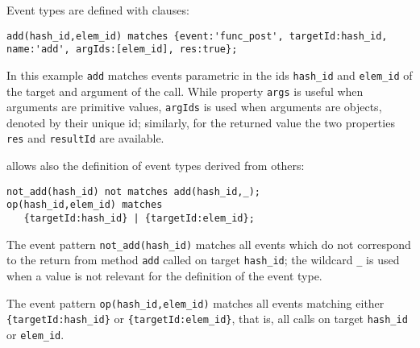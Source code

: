 Event types are defined with clauses:
\begin{lstlisting}[basicstyle=\ttfamily\scriptsize]
add(hash_id,elem_id) matches {event:'func_post', targetId:hash_id, name:'add', argIds:[elem_id], res:true};
\end{lstlisting}
In this example \lstinline{add} matches events parametric in the
ids \lstinline{hash_id} and \lstinline{elem_id} of the target and argument of the call. While property
\lstinline{args} is useful when arguments are primitive values, \lstinline{argIds} is used when arguments are objects, denoted by their unique id;
similarly, for the returned value the two properties \lstinline{res} and \lstinline{resultId} are available.




\rml allows also the definition of event types derived from others:

\begin{lstlisting}[basicstyle=\ttfamily\scriptsize]
not_add(hash_id) not matches add(hash_id,_);
op(hash_id,elem_id) matches 
   {targetId:hash_id} | {targetId:elem_id};
\end{lstlisting}  
The event pattern \lstinline{not_add(hash_id)} matches all events which do not correspond to the return from
method \lstinline{add} called on target \lstinline{hash_id}; the wildcard \lstinline!_! is used when a value is not relevant for
the definition of the event type.

The event pattern \lstinline{op(hash_id,elem_id)} matches all events matching either \lstinline!{targetId:hash_id}! or
\lstinline!{targetId:elem_id}!, that is, all calls on target \lstinline{hash_id} or \lstinline{elem_id}.

